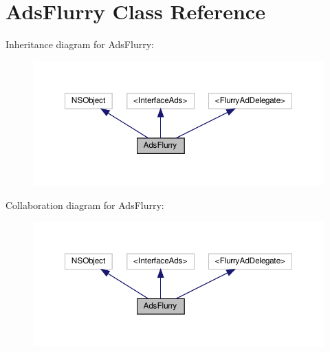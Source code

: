 \hypertarget{interfaceAdsFlurry}{}\section{Ads\+Flurry Class Reference}
\label{interfaceAdsFlurry}


Inheritance diagram for Ads\+Flurry\+:
\nopagebreak
\begin{figure}[H]
\begin{center}
\leavevmode
\includegraphics[width=350pt]{interfaceAdsFlurry__inherit__graph}
\end{center}
\end{figure}


Collaboration diagram for Ads\+Flurry\+:
\nopagebreak
\begin{figure}[H]
\begin{center}
\leavevmode
\includegraphics[width=350pt]{interfaceAdsFlurry__coll__graph}
\end{center}
\end{figure}
